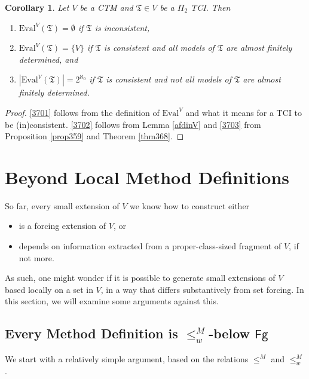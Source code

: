 \documentclass[12pt, twoside]{memoir}
\numberwithin{equation}{section}
\newtheorem{cor}[thm]{Corollary}
\theoremstyle{definition}
\theoremstyle{remark}
\theoremstyle{definition}
\theoremstyle{definition}
\theoremstyle{definition}
\theoremstyle{remark}
\begin{document}
\begin{cor}
Let $V$ be a CTM and $\mathfrak{T} \in V$ be a $\Pi_2$ TCI. Then
\begin{enumerate}[label=(\arabic*)]
    \item\label{3701} $\mathrm{Eval}^V(\mathfrak{T}) = \emptyset$ if $\mathfrak{T}$ is inconsistent,
    \item\label{3702} $\mathrm{Eval}^V(\mathfrak{T}) = \{V\}$ if $\mathfrak{T}$ is consistent and all models of $\mathfrak{T}$ are almost finitely determined, and
    \item\label{3703} $|\mathrm{Eval}^V(\mathfrak{T})| = 2^{\aleph_0}$ if $\mathfrak{T}$ is consistent and not all models of $\mathfrak{T}$ are almost finitely determined.
\end{enumerate}
\end{cor}

\begin{proof}
\ref{3701} follows from the definition of $\mathrm{Eval}^V$ and what it means for a TCI to be (in)consistent. \ref{3702} follows from Lemma \ref{afdinV} and \ref{3703} from Proposition \ref{prop359} and Theorem \ref{thm368}.
\end{proof}

\section{Beyond Local Method Definitions}

So far, every small extension of $V$ we know how to construct either
\begin{itemize}
    \item is a forcing extension of $V$, or
    \item depends on information extracted from a proper-class-sized fragment of $V$, if not more.
\end{itemize} 
As such, one might wonder if it is possible to generate small extensions of $V$ based locally on a set in $V$, in a way that differs substantively from set forcing. In this section, we will examine some arguments against this.

\subsection{Every Method Definition is \texorpdfstring{$\leq^M_w$-below $\mathsf{Fg}$}{weakly M-reducible in Fg}}

We start with a relatively simple argument, based on the relations $\leq^M$ and $\leq^M_w$.
\end{document}
